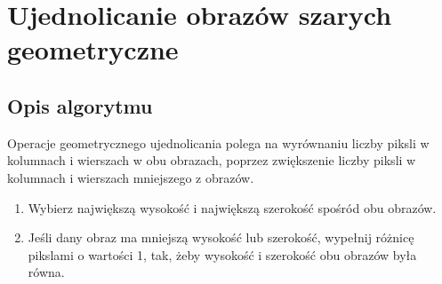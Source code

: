 \documentclass[a4paper,12pt, titlepage]{report}
\begin{document}
\section{Ujednolicanie obrazów szarych geometryczne}
\subsection*{Opis algorytmu}
\par Operacje geometrycznego ujednolicania polega na wyrównaniu liczby piksli w kolumnach i wierszach w obu obrazach, poprzez zwiększenie liczby piksli w kolumnach i wierszach mniejszego z obrazów.
\begin{enumerate}
\item Wybierz największą wysokość i największą szerokość spośród obu obrazów.
\item Jeśli dany obraz ma mniejszą wysokość lub szerokość, wypełnij różnicę pikslami o wartości 1, tak, żeby wysokość i szerokość obu obrazów była równa.
\end{enumerate}
\end{document}
